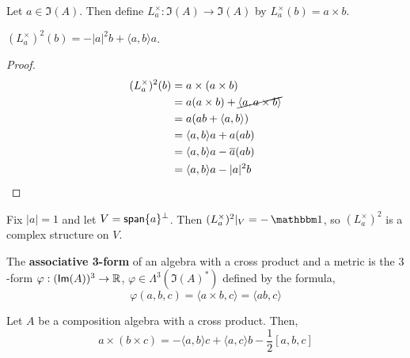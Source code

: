 \begin{defn}
    Let $a \in \Im(A)$. Then define $L^\times_a : \Im(A)\to \Im(A)$ by $L_a^\times(b)=a\times b$.
\end{defn}
\begin{lemma}
    $(L_a^\times)^2 (b) = -|a|^2b+\langle a,b\rangle a$.
\end{lemma}
\begin{proof}
    \begin{align*}
        (L_a^\times)^2 (b)&= a\times (a\times b)\\
        &= a(a\times b)+\cancel{\langle a,a\times b\rangle}\\
        &= a(ab+\langle a,b\rangle)\\
        &= \langle a,b\rangle a + a(ab)\\
        &= \langle a,b\rangle a - \overline{a}(ab)\\
        &= \langle a,b\rangle a - |a|^2b
    \end{align*}
\end{proof}
\begin{remark*}
    Fix $|a|=1$ and let $V = \operatorname{\textsf{span}}\{a\}^\perp$. Then $(L^\times_a)^2|_V = -\One$, so $(L^\times_a)^2$ is a complex structure on $V$.
\end{remark*}
\begin{defn}
    The \textbf{associative 3-form} of an algebra with a cross product and a metric is the $3$-form $\varphi : (\textsf{Im}(A))^3\to \operatorname{\mathbb{R}}$, $\varphi \in \Lambda^3(\Im(A)^*)$ defined by the formula,
    \begin{equation}
        \varphi(a,b,c)=\langle a\times b,c\rangle = \langle ab,c\rangle
    \end{equation}
\end{defn}
\begin{lemma}
Let $A$ be a composition algebra with a cross product. Then,
\begin{equation}a\times(b\times c)=-\langle a,b\rangle c+\langle a,c\rangle b - \frac{1}{2}[a,b,c]\end{equation}
\end{lemma}
